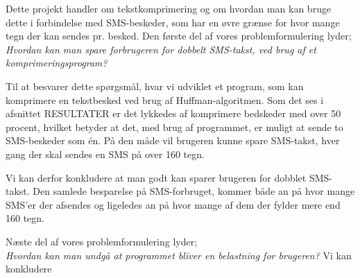Dette projekt handler om tekstkomprimering og om hvordan man kan bruge dette i forbindelse med SMS-beskeder, som har en øvre grænse for hvor mange tegn der kan sendes pr. besked. Den første del af vores problemformulering lyder;\\
\emph{Hvordan kan man spare forbrugeren for dobbelt SMS-takst, ved brug af et komprimeringsprogram?}

Til at besvarer dette spørgsmål, hvar vi udviklet et program, som kan komprimere en tekstbesked ved brug af Huffman-algoritmen. Som det ses i afsnittet RESULTATER er det lykkedes af komprimere bedskeder med over 50 procent, hvilket betyder at det, med brug af programmet, er muligt at sende to SMS-beskeder som én. På den måde vil brugeren kunne spare SMS-takst, hver gang der skal sendes en SMS på over 160 tegn.

Vi kan derfor konkludere at man godt kan sparer brugeren for dobblet SMS-takst. Den samlede besparelse på SMS-forbruget, kommer både an på hvor mange SMS'er der afsendes og ligeledes an på hvor mange af dem der fylder mere end 160 tegn. 

Næste del af vores problemformulering lyder;\\
\emph{Hvordan kan man undgå at programmet bliver en belastning for brugeren?} 
Vi kan konkludere 

